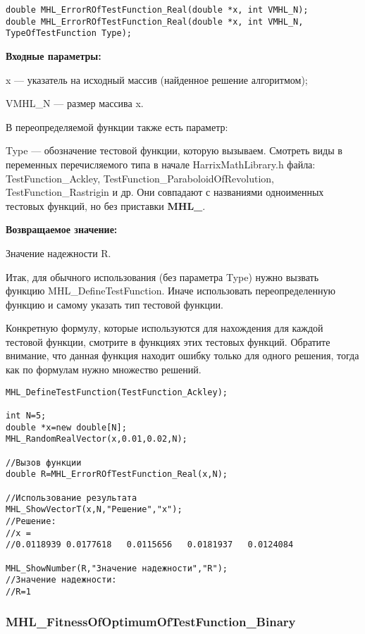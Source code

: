 \documentclass[a4paper,12pt]{article}
\begin{document}
\begin{lstlisting}[label=code_syntax_MHL_ErrorROfTestFunction_Real,caption=Синтаксис]
double MHL_ErrorROfTestFunction_Real(double *x, int VMHL_N);
double MHL_ErrorROfTestFunction_Real(double *x, int VMHL_N, TypeOfTestFunction Type);
\end{lstlisting}

\textbf{Входные параметры:}

x --- указатель на исходный массив (найденное решение алгоритмом);

VMHL\_N --- размер массива x.

В переопределяемой функции также есть параметр:
  
Type --- обозначение тестовой функции, которую вызываем.
Смотреть виды в переменных перечисляемого типа в начале HarrixMathLibrary.h файла: TestFunction\_Ackley, TestFunction\_ParaboloidOfRevolution, TestFunction\_Rastrigin и др. Они совпадают с названиями одноименных тестовых функций, но без приставки \textbf{MHL\_}.

\textbf{Возвращаемое значение:}
 
Значение надежности R.

Итак, для обычного использования (без параметра Type) нужно вызвать функцию MHL\_DefineTestFunction. Иначе использовать переопределенную функцию и самому указать тип тестовой функции.

Конкретную формулу, которые используются для нахождения для каждой тестовой функции, смотрите в функциях этих тестовых функций. Обратите внимание, что данная функция находит ошибку только для одного решения, тогда как по формулам нужно множество решений.


\begin{lstlisting}[label=code_use_MHL_ErrorROfTestFunction_Real,caption=Пример использования]
MHL_DefineTestFunction(TestFunction_Ackley);

int N=5;
double *x=new double[N];
MHL_RandomRealVector(x,0.01,0.02,N);

//Вызов функции
double R=MHL_ErrorROfTestFunction_Real(x,N);

//Использование результата
MHL_ShowVectorT(x,N,"Решение","x");
//Решение:
//x =
//0.0118939	0.0177618	0.0115656	0.0181937	0.0124084

MHL_ShowNumber(R,"Значение надежности","R");
//Значение надежности:
//R=1
\end{lstlisting}

\subsubsection{MHL\_FitnessOfOptimumOfTestFunction\_Binary}\label{MHL_FitnessOfOptimumOfTestFunction_Binary}
\end{document}
